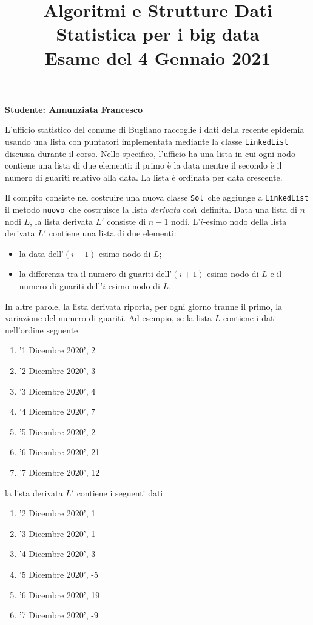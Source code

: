\documentclass{amsart}
\begin{document}
\title{Algoritmi e Strutture Dati\\
Statistica per i big data\\
Esame del 4 Gennaio 2021
}


\newcommand{\NomeStudente}{Annunziata Francesco}
\newcommand{\nomeClasse}{{\tt{Sol}}}
\newcommand{\nomeMetodo}{{\tt{nuovo}}}
\newcommand{\oraconsegna}{10:35}
\newcommand{\dataoggi}{4 Gennaio, 2021}


\maketitle

\hfill{{\bf Studente: \NomeStudente}}

\smallskip
L'ufficio statistico del comune di Bugliano raccoglie i dati della
recente epidemia usando una lista con puntatori implementata mediante la 
classe {\tt{LinkedList}} discussa durante il corso.
Nello specifico, l'ufficio ha una lista in cui ogni nodo contiene una
lista di due elementi: il primo \`e la data mentre il secondo \`e il
numero di guariti relativo alla data.
La lista \`e ordinata per data crescente. 

Il compito consiste nel costruire una nuova classe \nomeClasse\ che 
aggiunge a {\tt{LinkedList}} il metodo \nomeMetodo\
che costruisce la lista {\em derivata} cos\`\i\ definita.
Data una lista di $n$ nodi $L$, la lista derivata $L'$ consiste di $n-1$
nodi. L'$i$-esimo nodo della lista derivata $L'$ contiene una lista
di due elementi:
\begin{itemize}
\item la data dell'$(i+1)$-esimo nodo di $L$;
\item la differenza tra il numero di guariti dell'$(i+1)$-esimo nodo di $L$
e il numero di guariti dell'$i$-esimo nodo di $L$.
\end{itemize}
In altre parole, la lista derivata riporta, per ogni giorno
tranne il primo, la variazione del numero di guariti.
Ad esempio, 
se la lista $L$ contiene i dati nell'ordine seguente
\begin{enumerate}
\item '1 Dicembre 2020', 2
\item '2 Dicembre 2020', 3
\item '3 Dicembre 2020', 4
\item '4 Dicembre 2020', 7
\item '5 Dicembre 2020', 2
\item '6 Dicembre 2020', 21
\item '7 Dicembre 2020', 12
\end{enumerate}
la lista derivata $L'$ contiene i seguenti dati
\begin{enumerate}
\item '2 Dicembre 2020', 1
\item '3 Dicembre 2020', 1
\item '4 Dicembre 2020', 3
\item '5 Dicembre 2020', -5
\item '6 Dicembre 2020', 19
\item '7 Dicembre 2020', -9
\end{enumerate}
\end{document}
